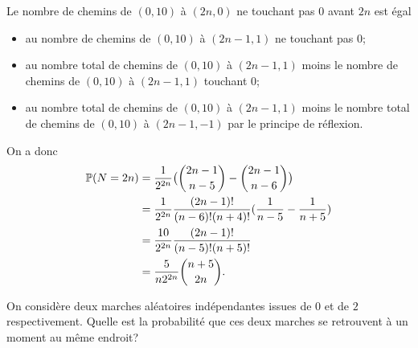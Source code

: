 \documentclass[11pt]{td_um}
\begin{document}
\begin{exo}{}
\begin{enumerate}
{             Le nombre de chemins de $(0,10)$ à $(2n,0)$ ne touchant pas $0$ avant $2n$ est égal 
             \begin{itemize}
                 \item au nombre de chemins de $(0,10)$ à $(2n-1,1)$ ne touchant pas $0$;
                 \item au nombre total de chemins de $(0,10)$ à $(2n-1,1)$ moins le nombre de chemins de $(0,10)$ à $(2n-1,1)$ touchant $0$;
                 \item au nombre total de chemins de $(0,10)$ à $(2n-1,1)$ moins le nombre total de chemins de $(0,10)$ à $(2n-1,-1)$ par le principe de réflexion.
             \end{itemize}
             On a donc
             \begin{align*}
                 \mathbb{P}(N=2n)
                 &=\frac{1}{2^{2n}}\big(\binom{2n-1}{n-5}-\binom{2n-1}{n-6}\big)\\
                 &=\frac{1}{2^{2n}}\frac{(2n-1)!}{(n-6)!(n+4)!}(\frac{1}{n-5}-\frac{1}{n+5})\\
                 &=\frac{10}{2^{2n}}\frac{(2n-1)!}{(n-5)!(n+5)!}\\
                 &=\frac{5}{n2^{2n}}\binom{n+5}{2n}.
             \end{align*}
         }
 \end{enumerate}
\end{exo}


\begin{exo}{} %
On considère deux marches aléatoires indépendantes issues de $0$ et de $2$ respectivement. Quelle est la probabilité que ces deux marches se retrouvent à un moment au même endroit?
\end{exo}
\end{document}
